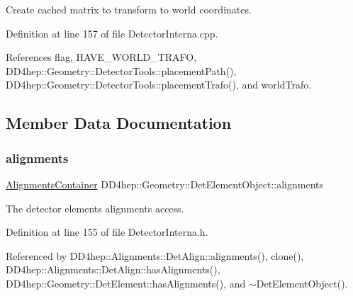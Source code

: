 Create cached matrix to transform to world coordinates. 



Definition at line 157 of file Detector\+Interna.\+cpp.



References flag, H\+A\+V\+E\+\_\+\+W\+O\+R\+L\+D\+\_\+\+T\+R\+A\+FO, D\+D4hep\+::\+Geometry\+::\+Detector\+Tools\+::placement\+Path(), D\+D4hep\+::\+Geometry\+::\+Detector\+Tools\+::placement\+Trafo(), and world\+Trafo.



\subsection{Member Data Documentation}
\hypertarget{class_d_d4hep_1_1_geometry_1_1_det_element_object_a400be16718ec486e44ad340f86946fcd}{}\label{class_d_d4hep_1_1_geometry_1_1_det_element_object_a400be16718ec486e44ad340f86946fcd} 
\subsubsection{\texorpdfstring{alignments}{alignments}}
{\footnotesize\ttfamily \hyperlink{class_d_d4hep_1_1_geometry_1_1_det_element_object_ab920e3c690de8d093cb556b0d3c87ce8}{Alignments\+Container} D\+D4hep\+::\+Geometry\+::\+Det\+Element\+Object\+::alignments}



The detector elements alignments access. 



Definition at line 155 of file Detector\+Interna.\+h.



Referenced by D\+D4hep\+::\+Alignments\+::\+Det\+Align\+::alignments(), clone(), D\+D4hep\+::\+Alignments\+::\+Det\+Align\+::has\+Alignments(), D\+D4hep\+::\+Geometry\+::\+Det\+Element\+::has\+Alignments(), and $\sim$\+Det\+Element\+Object().

\hypertarget{class_d_d4hep_1_1_geometry_1_1_det_element_object_add8a182c8a2e611f0241bb752dfe9046}{}\label{class_d_d4hep_1_1_geometry_1_1_det_element_object_add8a182c8a2e611f0241bb752dfe9046} 
